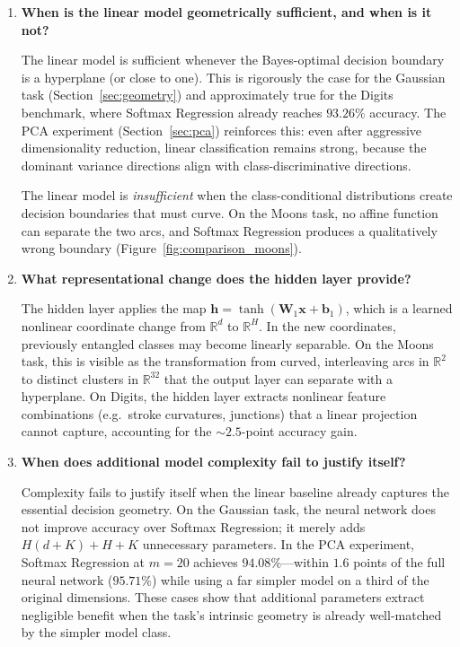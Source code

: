\documentclass[11pt]{article}
\newcommand{\R}{\mathbb{R}}
\newcommand{\bx}{\mathbf{x}}
\newcommand{\bW}{\mathbf{W}}
\newcommand{\bb}{\mathbf{b}}
\newcommand{\bh}{\mathbf{h}}
\begin{document}
\begin{enumerate}[leftmargin=2em,itemsep=0.5em]

\item \textbf{When is the linear model geometrically sufficient, and when is it not?}

The linear model is sufficient whenever the Bayes-optimal decision boundary is a hyperplane (or
close to one).  This is rigorously the case for the Gaussian task (Section~\ref{sec:geometry})
and approximately true for the Digits benchmark, where Softmax Regression already reaches
$93.26\%$ accuracy.  The PCA experiment (Section~\ref{sec:pca}) reinforces this: even after
aggressive dimensionality reduction, linear classification remains strong, because the dominant
variance directions align with class-discriminative directions.

The linear model is \emph{insufficient} when the class-conditional distributions create decision
boundaries that must curve.  On the Moons task, no affine function can separate the two arcs, and
Softmax Regression produces a qualitatively wrong boundary (Figure~\ref{fig:comparison_moons}).

\item \textbf{What representational change does the hidden layer provide?}

The hidden layer applies the map $\bh = \tanh(\bW_1\bx + \bb_1)$, which is a learned nonlinear
coordinate change from $\R^d$ to $\R^H$.  In the new coordinates, previously entangled classes
may become linearly separable.  On the Moons task, this is visible as the transformation from
curved, interleaving arcs in $\R^2$ to distinct clusters in $\R^{32}$ that the output layer can
separate with a hyperplane.  On Digits, the hidden layer extracts nonlinear feature combinations
(e.g.\ stroke curvatures, junctions) that a linear projection cannot capture, accounting for the
${\sim}2.5$-point accuracy gain.

\item \textbf{When does additional model complexity fail to justify itself?}

Complexity fails to justify itself when the linear baseline already captures the essential
decision geometry.  On the Gaussian task, the neural network does not improve accuracy over
Softmax Regression; it merely adds $H(d+K)+H+K$ unnecessary parameters.  In the PCA experiment,
Softmax Regression at $m{=}20$ achieves $94.08\%$---within $1.6$ points of the full neural
network ($95.71\%$) while using a far simpler model on a third of the original dimensions.  These
cases show that additional parameters extract negligible benefit when the task's intrinsic geometry
is already well-matched by the simpler model class.


\end{enumerate}
\end{document}
